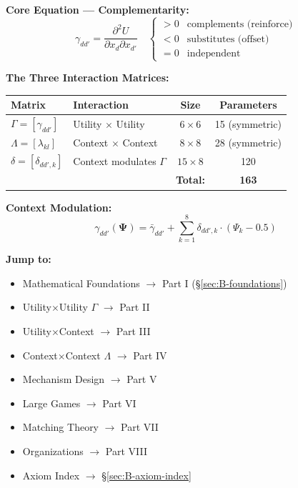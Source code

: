 \begin{tcolorbox}[colback=yellow!10!white, colframe=yellow!75!black,
    title=\textbf{Quick Reference}]

\textbf{Core Equation --- Complementarity:}
\[
\gamma_{dd'} = \frac{\partial^2 U}{\partial x_d \partial x_{d'}} \quad
\begin{cases}
> 0 & \text{complements (reinforce)} \\
< 0 & \text{substitutes (offset)} \\
= 0 & \text{independent}
\end{cases}
\]

\textbf{The Three Interaction Matrices:}
\begin{center}
\small
\begin{tabular}{@{}llcc@{}}
\toprule
\textbf{Matrix} & \textbf{Interaction} & \textbf{Size} & \textbf{Parameters} \\
\midrule
$\Gamma = [\gamma_{dd'}]$ & Utility $\times$ Utility & $6 \times 6$ & 15 (symmetric) \\
$\Lambda = [\lambda_{kl}]$ & Context $\times$ Context & $8 \times 8$ & 28 (symmetric) \\
$\delta = [\delta_{dd',k}]$ & Context modulates $\Gamma$ & $15 \times 8$ & 120 \\
\midrule
& & \textbf{Total:} & \textbf{163} \\
\bottomrule
\end{tabular}
\end{center}

\textbf{Context Modulation:}
\[
\gamma_{dd'}(\boldsymbol{\Psi}) = \bar{\gamma}_{dd'} + \sum_{k=1}^{8} \delta_{dd',k} \cdot (\Psi_k - 0.5)
\]

\textbf{Jump to:}
\begin{itemize}[nosep]
    \item Mathematical Foundations $\rightarrow$ Part I (\S\ref{sec:B-foundations})
    \item Utility$\times$Utility $\Gamma$ $\rightarrow$ Part II
    \item Utility$\times$Context $\rightarrow$ Part III
    \item Context$\times$Context $\Lambda$ $\rightarrow$ Part IV
    \item Mechanism Design $\rightarrow$ Part V
    \item Large Games $\rightarrow$ Part VI
    \item Matching Theory $\rightarrow$ Part VII
    \item Organizations $\rightarrow$ Part VIII
    \item Axiom Index $\rightarrow$ \S\ref{sec:B-axiom-index}
\end{itemize}

\end{tcolorbox}





